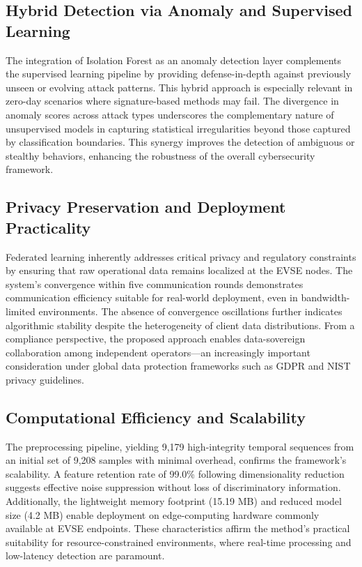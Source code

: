 \subsection{Hybrid Detection via Anomaly and Supervised Learning}
The integration of Isolation Forest as an anomaly detection layer complements the supervised learning pipeline by providing defense-in-depth against previously unseen or evolving attack patterns. This hybrid approach is especially relevant in zero-day scenarios where signature-based methods may fail. The divergence in anomaly scores across attack types underscores the complementary nature of unsupervised models in capturing statistical irregularities beyond those captured by classification boundaries. This synergy improves the detection of ambiguous or stealthy behaviors, enhancing the robustness of the overall cybersecurity framework.

\subsection{Privacy Preservation and Deployment Practicality}
Federated learning inherently addresses critical privacy and regulatory constraints by ensuring that raw operational data remains localized at the EVSE nodes. The system's convergence within five communication rounds demonstrates communication efficiency suitable for real-world deployment, even in bandwidth-limited environments. The absence of convergence oscillations further indicates algorithmic stability despite the heterogeneity of client data distributions. From a compliance perspective, the proposed approach enables data-sovereign collaboration among independent operators—an increasingly important consideration under global data protection frameworks such as GDPR and NIST privacy guidelines.

\subsection{Computational Efficiency and Scalability}
The preprocessing pipeline, yielding 9,179 high-integrity temporal sequences from an initial set of 9,208 samples with minimal overhead, confirms the framework’s scalability. A feature retention rate of 99.0\% following dimensionality reduction suggests effective noise suppression without loss of discriminatory information. Additionally, the lightweight memory footprint (15.19 MB) and reduced model size (4.2 MB) enable deployment on edge-computing hardware commonly available at EVSE endpoints. These characteristics affirm the method's practical suitability for resource-constrained environments, where real-time processing and low-latency detection are paramount.

